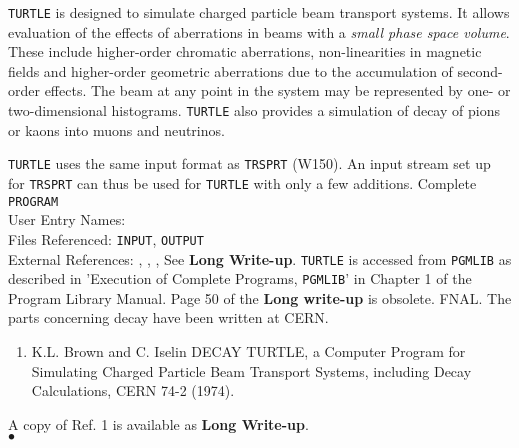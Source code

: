                            
             
                      
                           
{\tt TURTLE} is designed to simulate charged particle beam transport
systems. It allows evaluation of the effects of aberrations in beams
with a  {\it small phase space volume}. These include higher-order
chromatic aberrations, non-linearities in magnetic fields and
higher-order geometric aberrations due to the accumulation of
second-order effects. The beam at any point in the system may be
represented by one- or two-dimensional histograms. {\tt TURTLE} also
provides a simulation of decay of pions or kaons into muons and
neutrinos.
\par
{\tt TURTLE} uses the same input format as {\tt TRSPRT} (W150). An input
stream set up for {\tt TRSPRT} can thus be used for {\tt TURTLE} with
only a few additions.
\Structure
Complete {\tt PROGRAM}\\
User Entry Names: \\
Files Referenced: {\tt INPUT}, {\tt OUTPUT}\\
External References: , ,
, 
\Usage
See {\bf Long Write-up}.
{\tt TURTLE} is accessed from {\tt PGMLIB} as described in
'Execution of Complete Programs, {\tt PGMLIB}' in Chapter 1 of the
Program Library Manual. Page 50 of the {\bf Long write-up} is obsolete.
\Source
FNAL. The parts concerning decay have been written at CERN.
\Refer
\begin{enumerate}
\item K.L. Brown and C. Iselin
DECAY TURTLE, a Computer Program for Simulating Charged Particle Beam
Transport Systems, including Decay Calculations, CERN 74-2 (1974).
\end{enumerate}
A copy of Ref. 1 is available as {\bf Long Write-up}.
\\ $\bullet$
